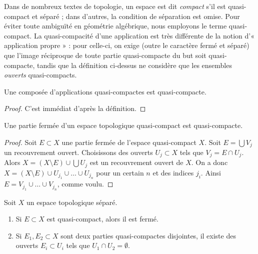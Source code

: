 \noindent
Dans de nombreux textes de topologie, un espace est dit {\it compact} s'il est
quasi-compact et séparé ; dans d'autres, la condition de séparation est omise.
Pour éviter toute ambiguïté en géométrie algébrique, nous employons le terme
quasi-compact. La quasi-compacité d'une application est très différente de la
notion d'« application propre » : pour celle-ci, on exige (outre le caractère
fermé et séparé) que l'image réciproque de toute partie quasi-compacte du but
soit quasi-compacte, tandis que la définition ci-dessus ne considère que les
ensembles {\it ouverts} quasi-compacts.

\begin{lemma}
\label{lemma-composition-quasi-compact}
Une composée d'applications quasi-compactes est quasi-compacte.
\end{lemma}

\begin{proof}
C'est immédiat d'après la définition.
\end{proof}

\begin{lemma}
\label{lemma-closed-in-quasi-compact}
Une partie fermée d'un espace topologique quasi-compact est quasi-compacte.
\end{lemma}

\begin{proof}
Soit $E \subset X$ une partie fermée de l'espace quasi-compact $X$.
Soit $E = \bigcup V_j$ un recouvrement ouvert. Choisissons des ouverts
$U_j \subset X$ tels que $V_j = E \cap U_j$. Alors
$X = (X \setminus E) \cup \bigcup U_j$ est un recouvrement ouvert de $X$.
On a donc $X = (X \setminus E) \cup U_{j_1} \cup \ldots \cup U_{j_n}$ pour
un certain $n$ et des indices $j_i$.
Ainsi $E = V_{j_1} \cup \ldots \cup V_{j_n}$, comme voulu.
\end{proof}

\begin{lemma}
\label{lemma-quasi-compact-in-Hausdorff}
Soit $X$ un espace topologique séparé.
\begin{enumerate}
\item Si $E \subset X$ est quasi-compact, alors il est fermé.
\item Si $E_1, E_2 \subset X$ sont deux parties quasi-compactes disjointes,
il existe des ouverts $E_i \subset U_i$ tels que
$U_1 \cap U_2 = \emptyset$.
\end{enumerate}
\end{lemma}

